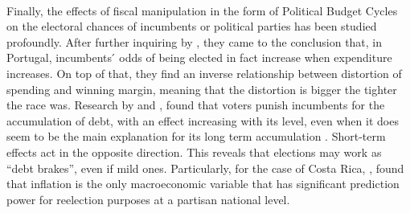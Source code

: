 \\
Finally, the effects of fiscal manipulation in the form of Political Budget Cycles on the electoral chances of incumbents or political parties has been studied profoundly. After further inquiring by \textcite{aidt2011}, they came to the conclusion that, in Portugal, incumbents ́ odds of being elected in fact increase when expenditure increases. On top of that, they find an inverse relationship between distortion of spending and winning margin, meaning that the distortion is bigger the tighter the race was. Research by \textcite{drazen2010} and \textcite{cassette2014}, found that voters punish incumbents for the accumulation of debt, with an effect increasing with its level, even when it does seem to be the main explanation for its long term accumulation \parencite{alesina2016}. Short-term effects act in the opposite direction. This reveals that elections may work as “debt brakes”, even if mild ones. Particularly, for the case of Costa Rica, \textcite{hernandez2014}, found that inflation is the only macroeconomic variable that has significant prediction power for reelection purposes at a partisan national level. 

